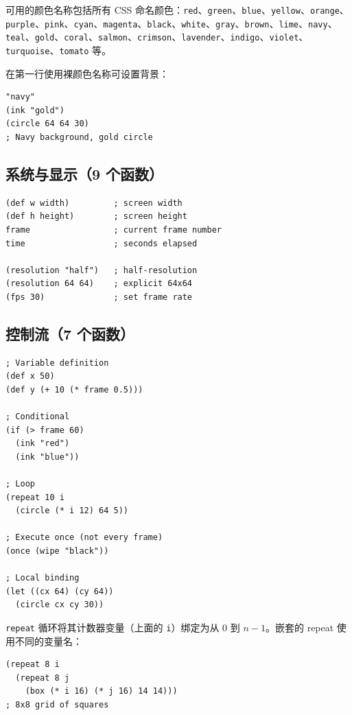 \documentclass[10pt,letterpaper,twocolumn]{article}
\begin{document}
可用的颜色名称包括所有 CSS 命名颜色：\texttt{red}、\texttt{green}、\texttt{blue}、\texttt{yellow}、\texttt{orange}、\texttt{purple}、\texttt{pink}、\texttt{cyan}、\texttt{magenta}、\texttt{black}、\texttt{white}、\texttt{gray}、\texttt{brown}、\texttt{lime}、\texttt{navy}、\texttt{teal}、\texttt{gold}、\texttt{coral}、\texttt{salmon}、\texttt{crimson}、\texttt{lavender}、\texttt{indigo}、\texttt{violet}、\texttt{turquoise}、\texttt{tomato} 等。

在第一行使用裸颜色名称可设置背景：

\begin{lstlisting}
"navy"
(ink "gold")
(circle 64 64 30)
; Navy background, gold circle
\end{lstlisting}

\subsection{系统与显示（9 个函数）}

\begin{lstlisting}
(def w width)         ; screen width
(def h height)        ; screen height
frame                 ; current frame number
time                  ; seconds elapsed

(resolution "half")   ; half-resolution
(resolution 64 64)    ; explicit 64x64
(fps 30)              ; set frame rate
\end{lstlisting}

\subsection{控制流（7 个函数）}

\begin{lstlisting}
; Variable definition
(def x 50)
(def y (+ 10 (* frame 0.5)))

; Conditional
(if (> frame 60)
  (ink "red")
  (ink "blue"))

; Loop
(repeat 10 i
  (circle (* i 12) 64 5))

; Execute once (not every frame)
(once (wipe "black"))

; Local binding
(let ((cx 64) (cy 64))
  (circle cx cy 30))
\end{lstlisting}

\texttt{repeat} 循环将其计数器变量（上面的 \texttt{i}）绑定为从 0 到 $n-1$。嵌套的 repeat 使用不同的变量名：

\begin{lstlisting}
(repeat 8 i
  (repeat 8 j
    (box (* i 16) (* j 16) 14 14)))
; 8x8 grid of squares
\end{lstlisting}
\end{document}
